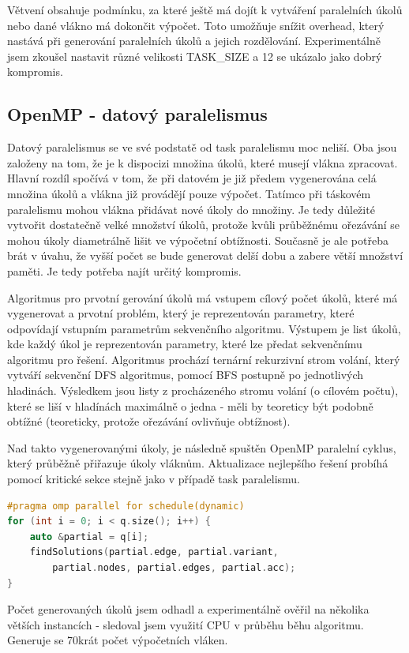 \documentclass{article}%
\begin{document}
Větvení obsahuje podmínku, za které ještě má dojít k vytváření paralelních úkolů nebo dané vlákno má dokončit výpočet. Toto umožňuje snížit overhead, který nastává při generování paralelních úkolů a jejich rozdělování. Experimentálně jsem zkoušel nastavit různé velikosti TASK\_SIZE a 12 se ukázalo jako dobrý kompromis.

\subsection{OpenMP - datový paralelismus}
Datový paralelismus se ve své podstatě od task paralelismu moc neliší. Oba jsou založeny na tom, že je k dispocizi množina úkolů, které musejí vlákna zpracovat. Hlavní rozdíl spočívá v tom, že při datovém je již předem vygenerována celá množina úkolů a vlákna již provádějí pouze výpočet. Tatímco při táskovém paralelismu mohou vlákna přidávat nové úkoly do množiny. Je tedy důležité vytvořit dostatečně velké množství úkolů, protože kvůli průběžnému ořezávání se mohou úkoly diametrálně lišit ve výpočetní obtížnosti. Současně je ale potřeba brát v úvahu, že vyšší počet se bude generovat delší dobu a zabere větší množství paměti. Je tedy potřeba najít určitý kompromis.

Algoritmus pro prvotní gerování úkolů má vstupem cílový počet úkolů, které má vygenerovat a prvotní problém, který je reprezentován parametry, které odpovídají vstupním parametrům sekvenčního algoritmu. Výstupem je list úkolů, kde každý úkol je reprezentován parametry, které lze předat sekvenčnímu algoritmu pro řešení. Algoritmus prochází ternární rekurzivní strom volání, který vytváří sekvenční DFS algoritmus, pomocí BFS postupně po jednotlivých hladinách. Výsledkem jsou listy z procházeného stromu volání (o cílovém počtu), které se liší v hladínách maximálně o jedna - měli by teoreticy být podobně obtížné (teoreticky, protože ořezávání ovlivňuje obtížnost).

Nad takto vygenerovanými úkoly, je následně spuštěn OpenMP paralelní cyklus, který průběžně přiřazuje úkoly vláknům. Aktualizace nejlepšího řešení probíhá pomocí kritické sekce stejně jako v případě task paralelismu.
\begin{lstlisting}[language=c++]
#pragma omp parallel for schedule(dynamic)
for (int i = 0; i < q.size(); i++) {
    auto &partial = q[i];
    findSolutions(partial.edge, partial.variant,
        partial.nodes, partial.edges, partial.acc);
}
\end{lstlisting}

Počet generovaných úkolů jsem odhadl a experimentálně ověřil na několika větších instancích - sledoval jsem využití CPU v průběhu běhu algoritmu. Generuje se 70krát počet výpočetních vláken.
\end{document}
